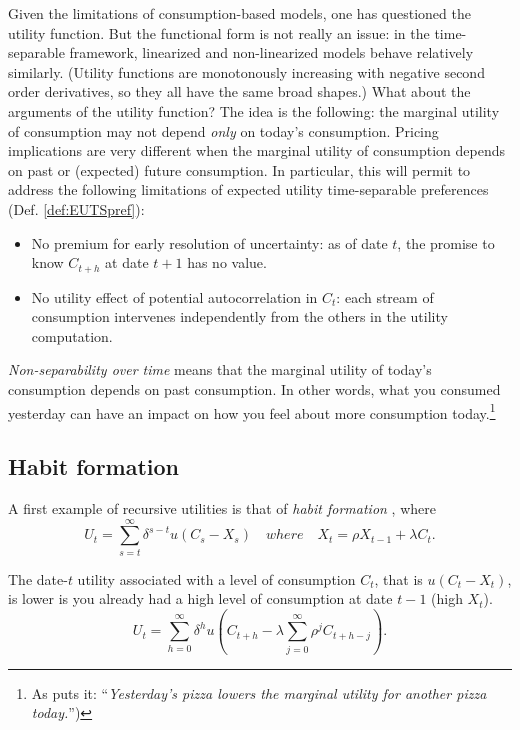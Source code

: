 \documentclass[
  12pt,
]{book}
\providecommand{\tightlist}{%
  \setlength{\itemsep}{0pt}\setlength{\parskip}{0pt}}
\theoremstyle{definition}
\theoremstyle{definition}
\theoremstyle{definition}
\theoremstyle{definition}
\theoremstyle{remark}
\begin{document}
Given the limitations of consumption-based models, one has questioned the utility function. But the functional form is not really an issue: in the time-separable framework, linearized and non-linearized models behave relatively similarly. (Utility functions are monotonously increasing with negative second order derivatives, so they all have the same broad shapes.) What about the arguments of the utility function? The idea is the following: the marginal utility of consumption may not depend \emph{only} on today's consumption. Pricing implications are very different when the marginal utility of consumption depends on past or (expected) future consumption. In particular, this will permit to address the following limitations of expected utility time-separable preferences (Def. \ref{def:EUTSpref}):

\begin{itemize}
\tightlist
\item
  No premium for early resolution of uncertainty: as of date \(t\), the promise to know \(C_{t+h}\) at date \(t+1\) has no value.
\item
  No utility effect of potential autocorrelation in \(C_t\): each stream of consumption intervenes independently from the others in the utility computation.
\end{itemize}

\emph{Non-separability over time} means that the marginal utility of today's consumption depends on past consumption. In other words, what you consumed yesterday can have an impact on how you feel about more consumption today.\footnote{As \citet{Cochrane_2005} puts it: ``\emph{Yesterday's pizza lowers the marginal utility for another pizza today.}'')}

\hypertarget{habit-formation}{%
\subsection{Habit formation}\label{habit-formation}}

A first example of recursive utilities is that of \emph{habit formation} \citep{Campbell_Shiller_1999}, where
\begin{equation}
U_t = \sum_{s=t}^{\infty} \delta^{s-t} u(C_s - X_s) \quad where \quad X_t = \rho X_{t-1} + \lambda C_t.\label{eq:Uhabitnonstoch}
\end{equation}

The date-\(t\) utility associated with a level of consumption \(C_t\), that is \(u(C_t - X_t)\), is lower is you already had a high level of consumption at date \(t-1\) (high \(X_t\)).
\[
U_t = \sum_{h=0}^{\infty} \delta^{h}u\left(C_{t+h} - \lambda \sum_{j=0}^\infty \rho^j C_{t+h-j}\right).
\]
\end{document}
